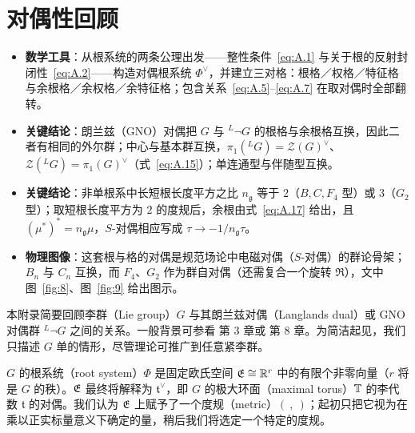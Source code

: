 

\appendix
\section{对偶性回顾}
\label{sec:A}

\begin{keytakeaways}
  \begin{itemize}[leftmargin=1.4em,itemsep=2pt,topsep=2pt]
    \item \textbf{数学工具}：从根系统的两条公理出发——整性条件~\eqref{eq:A.1} 与关于根的反射封闭性~\eqref{eq:A.2}——构造对偶根系统 $\Phi^\vee$，并建立三对格：根格／权格／特征格与余根格／余权格／余特征格；包含关系~\eqref{eq:A.5}--\eqref{eq:A.7} 在取对偶时全部翻转。
    \item \textbf{关键结论}：朗兰兹（GNO）对偶把 $G$ 与 $^L\neg G$ 的根格与余根格互换，因此二者有相同的外尔群；中心与基本群互换，$\pi_1({}^LG)={\mathcal Z}(G)^\vee$、${\mathcal Z}({}^LG)=\pi_1(G)^\vee$（式~\eqref{eq:A.15}）；单连通型与伴随型互换。
    \item \textbf{关键结论}：非单根系中长短根长度平方之比 $n_{\mathfrak g}$ 等于 $2$（$B,C,F_4$ 型）或 $3$（$G_2$ 型）；取短根长度平方为 $2$ 的度规后，余根由式~\eqref{eq:A.17} 给出，且 $(\mu^*)^*=n_{\mathfrak g}\mu$，$S$-对偶相应写成 $\tau\to-1/n_{\mathfrak g}\tau$。
    \item \textbf{物理图像}：这套根与格的对偶是规范场论中电磁对偶（$S$-对偶）的群论骨架；$B_n$ 与 $C_n$ 互换，而 $F_4$、$G_2$ 作为群自对偶（还需复合一个旋转 $\mathfrak R$），文中图~\ref{fig:8}、图~\ref{fig:9} 给出图示。
  \end{itemize}
\end{keytakeaways}

本附录简要回顾李群（Lie group）$G$ 与其朗兰兹对偶（Langlands dual）或 GNO 对偶群 $^L\neg G$ 之间的关系。一般背景可参看 \cite{ref90} 第 3 章或 \cite{ref91} 第 8 章。为简洁起见，我们只描述 $G$ 单的情形，尽管理论可推广到任意紧李群。

$G$ 的根系统（root system）$\Phi$ 是固定欧氏空间 $\mathfrak{E}\cong \mathbb{R}^r$ 中的有限个非零向量（$r$ 将是 $G$ 的秩）。$\mathfrak{E}$ 最终将解释为 $\mathfrak t^\vee$，即 $G$ 的极大环面（maximal torus）${\mathbb{T}}$ 的李代数 $\mathfrak t$ 的对偶。我们认为 $\mathfrak{E}$ 上赋予了一个度规（metric）$(~,~)$；起初只把它视为在乘以正实标量意义下确定的量，稍后我们将选定一个特定的度规。

